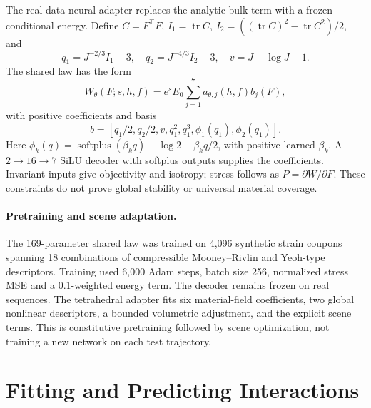 \documentclass[10pt,twocolumn,letterpaper]{article}
\begin{document}
The real-data neural adapter replaces the analytic bulk term with a frozen conditional energy. Define $C=F^\top F$, $I_1=\operatorname{tr}C$, $I_2=((\operatorname{tr}C)^2-\operatorname{tr}C^2)/2$, and
\begin{equation}
q_1=J^{-2/3}I_1-3,\quad q_2=J^{-4/3}I_2-3,\quad v=J-\log J-1.
\end{equation}
The shared law has the form
\begin{equation}\label{eq:neural}
W_\theta(F;s,h,f)=e^s E_0\sum_{j=1}^{7}a_{\theta,j}(h,f)b_j(F),
\end{equation}
with positive coefficients and basis
\begin{equation}
b=[q_1/2,q_2/2,v,q_1^2,q_1^3,\phi_1(q_1),\phi_2(q_1)].
\end{equation}
Here $\phi_k(q)=\operatorname{softplus}(\beta_kq)-\log2-\beta_kq/2$, with positive learned $\beta_k$. A $2\!\to\!16\!\to\!7$ SiLU decoder with softplus outputs supplies the coefficients. Invariant inputs give objectivity and isotropy; stress follows as $P=\partial W/\partial F$. These constraints do not prove global stability or universal material coverage.

\paragraph{Pretraining and scene adaptation.}
The 169-parameter shared law was trained on 4,096 synthetic strain coupons spanning 18 combinations of compressible Mooney--Rivlin and Yeoh-type descriptors. Training used 6,000 Adam steps, batch size 256, normalized stress MSE and a 0.1-weighted energy term. The decoder remains frozen on real sequences. The tetrahedral adapter fits six material-field coefficients, two global nonlinear descriptors, a bounded volumetric adjustment, and the explicit scene terms. This is constitutive pretraining followed by scene optimization, not training a new network on each test trajectory.

\section{Fitting and Predicting Interactions}
\end{document}
